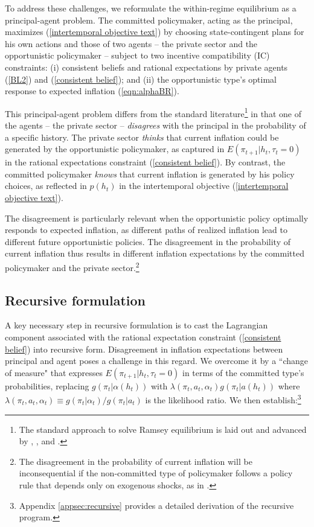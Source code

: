 \documentclass[12pt,letter,leqno]{article}
\theoremstyle{asn}
\theoremstyle{lem}
\theoremstyle{slem}
\theoremstyle{prop}
\theoremstyle{appprop}
\theoremstyle{rem}
\theoremstyle{defn}
\begin{document}
To address these challenges, we reformulate the within-regime equilibrium as a principal-agent problem. The committed policymaker, acting as the principal, maximizes (\ref{intertemporal objective text}) by choosing state-contingent plans for his own actions and those of two agents -- the private sector and the opportunistic policymaker -- subject to two incentive compatibility (IC) constraints: (i) consistent beliefs and rational expectations by private agents (\ref{BL2}) and (\ref{consistent belief}); and (ii) the opportunistic type’s optimal response to expected inflation (\ref{eqn:alphaBR}).

This principal-agent problem differs from the standard literature\footnote{The standard approach to solve Ramsey equilibrium is laid out and advanced by \cite{kydland_dynamic_1980}, \cite{chang_credible_1998}, \cite{phelan_sequential_2001} and \cite{marcet_recursive_2019}.} in that one of the agents -- the private sector -- \textit{disagrees} with the principal in the probability of a specific history. The private sector \textit{thinks} that current inflation could be generated by the opportunistic policymaker, as captured in $E(\pi_{t+1}|h_t,\tau_t=0)$ in the rational expectations constraint (\ref{consistent belief}). By contrast, the committed policymaker \textit{knows} that current inflation is generated by his policy choices, as reflected in $p(h_t)$ in the intertemporal objective (\ref{intertemporal objective text}). 

The disagreement is particularly relevant when the opportunistic policy optimally responds to expected inflation, as different paths of realized inflation lead to different future opportunistic policies. The disagreement in the probability of current inflation thus results in different inflation expectations by the committed policymaker and the private sector.\footnote{The disagreement in the probability of current inflation will be inconsequential if the non-committed type of policymaker follows a policy rule that depends only on exogenous shocks, as in \cite{lu_optimal_2016}.} 

\subsection{Recursive formulation}

A key necessary step in recursive formulation is to cast the Lagrangian component associated with
the rational expectation constraint (\ref{consistent belief}) into recursive form. Disagreement in inflation expectations between principal and agent poses a challenge in this regard. We overcome it by a ``change of measure" that expresses $ E(\pi _{t+1}|h_{t},\tau_t=0)$ in terms of the committed type's probabilities, replacing $g(\pi_t|\alpha(h_t))$ with 
$\lambda(\pi _{t},a_{t},\alpha_{t})g(\pi_t |a(h_{t}))$ 
where $\lambda(\pi _{t},a_{t},\alpha_{t})\equiv g(\pi_{t}|\alpha_{t})/g(\pi_{t}|a_{t})$ is the likelihood ratio. 
We then establish:\footnote{Appendix \ref{appsec:recursive} provides a detailed derivation of the recursive program.}
\end{document}
